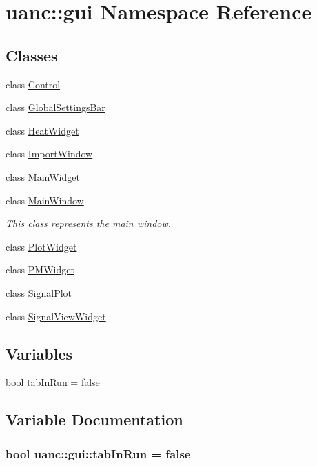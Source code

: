 \hypertarget{namespaceuanc_1_1gui}{}\section{uanc\+:\+:gui Namespace Reference}
\label{namespaceuanc_1_1gui}
\subsection*{Classes}
\begin{DoxyCompactItemize}
\item 
class \hyperlink{classuanc_1_1gui_1_1_control}{Control}
\item 
class \hyperlink{classuanc_1_1gui_1_1_global_settings_bar}{Global\+Settings\+Bar}
\item 
class \hyperlink{classuanc_1_1gui_1_1_heat_widget}{Heat\+Widget}
\item 
class \hyperlink{classuanc_1_1gui_1_1_import_window}{Import\+Window}
\item 
class \hyperlink{classuanc_1_1gui_1_1_main_widget}{Main\+Widget}
\item 
class \hyperlink{classuanc_1_1gui_1_1_main_window}{Main\+Window}
\begin{DoxyCompactList}\small\item\em This class represents the main window. \end{DoxyCompactList}\item 
class \hyperlink{classuanc_1_1gui_1_1_plot_widget}{Plot\+Widget}
\item 
class \hyperlink{classuanc_1_1gui_1_1_p_m_widget}{P\+M\+Widget}
\item 
class \hyperlink{classuanc_1_1gui_1_1_signal_plot}{Signal\+Plot}
\item 
class \hyperlink{classuanc_1_1gui_1_1_signal_view_widget}{Signal\+View\+Widget}
\end{DoxyCompactItemize}
\subsection*{Variables}
\begin{DoxyCompactItemize}
\item 
bool \hyperlink{namespaceuanc_1_1gui_a7181f128f937f0eb2f2d5204308a50bd}{tab\+In\+Run} = false
\end{DoxyCompactItemize}


\subsection{Variable Documentation}
\subsubsection[{\texorpdfstring{tab\+In\+Run}{tabInRun}}]{\setlength{\rightskip}{0pt plus 5cm}bool uanc\+::gui\+::tab\+In\+Run = false}\hypertarget{namespaceuanc_1_1gui_a7181f128f937f0eb2f2d5204308a50bd}{}\label{namespaceuanc_1_1gui_a7181f128f937f0eb2f2d5204308a50bd}
